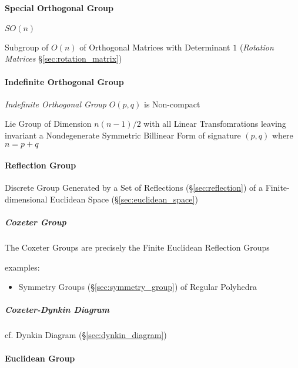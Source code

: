 \paragraph{Special Orthogonal Group}\label{sec:special_orthogonal_group}\hfill

$SO(n)$

Subgroup of $O(n)$ of Orthogonal Matrices with Determinant $1$ (\emph{Rotation
  Matrices} \S\ref{sec:rotation_matrix})



\paragraph{Indefinite Orthogonal Group}
\label{sec:indefinite_orthogonal_group}\hfill

\emph{Indefinite Orthogonal Group} $O(p,q)$ is Non-compact

Lie Group of Dimension $n(n-1)/2$ with all Linear Transfomrations leaving
invariant a Nondegenerate Symmetric Billinear Form of signature $(p,q)$ where
$n = p+q$



\paragraph{Reflection Group}\label{sec:reflection_group}\hfill

Discrete Group Generated by a Set of Reflections (\S\ref{sec:reflection}) of a
Finite-dimensional Euclidean Space (\S\ref{sec:euclidean_space})



\subparagraph{Coxeter Group}\label{sec:coxeter_group}\hfill

The Coxeter Groups are precisely the Finite Euclidean Reflection Groups

examples:
\begin{itemize}
  \item Symmetry Groups (\S\ref{sec:symmetry_group}) of Regular Polyhedra
\end{itemize}




\subparagraph{Coxeter-Dynkin Diagram}\label{sec:coxeter_dynkin_diagram}\hfill

cf. Dynkin Diagram (\S\ref{sec:dynkin_diagram})



\paragraph{Euclidean Group}\label{sec:euclidean_group}\hfill

